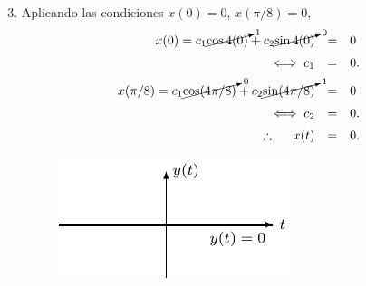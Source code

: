 \documentclass{beamer}
\begin{document}
\begin{frame}[t]
	\begin{exampleblock}{}
		\begin{enumerate}
			\setcounter{enumi}{2}
		\item Aplicando las condiciones \(x(0) = 0\), \(x(\pi /8) =0\),
			\[
				\begin{array}{rcl}
					x(0) = c_1 \cancelto{1}{\cos 4(0)} + c_2 \cancelto{0}{\sin 4(0)} & = & 0 \\[2mm]
					\iff c_1 & = & 0. \\[2mm]
					x(\pi /8) = c_1 \cancelto{0}{\cos (4 \pi /8)} + c_2 \cancelto{1}{\sin (4 \pi /8)} & = & 0 \\[2mm]
					\iff c_2 & = & 0. \\[2mm]
					\therefore \hspace{5mm} x(t) & = & 0.
				\end{array}
			\]
				\begin{figure}[hbtp!]
					\centering
					\includegraphics[width= 0.6 \linewidth]{IMAGENES/8/tikz.pdf}
				\end{figure}
		\end{enumerate}
	\end{exampleblock}
\end{frame}
\end{document}
